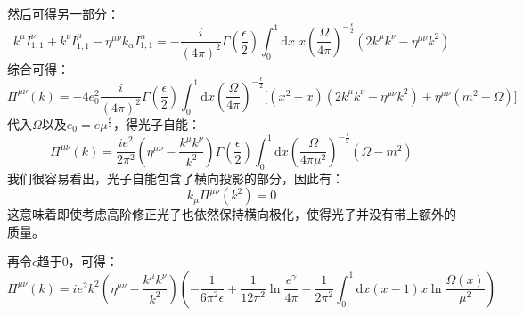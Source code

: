 然后可得另一部分：
\begin{equation}
    k^\mu I^\nu_{1,1}+k^\nu I^\mu_{1,1}-\eta^{\mu\nu}k_\alpha I^\alpha_{1,1} = -\frac{i}{(4\pi)^2}\Gamma(\frac{\epsilon}{2})\int_0^1\mathrm{d}x \;x \left(\frac{\Omega}{4\pi}\right)^{-\frac{\epsilon}{2}}(2k^\mu k^\nu-\eta^{\mu\nu}k^2)
\end{equation}
综合可得：
\begin{equation}
    \Pi^{\mu\nu}(k)=-4e_0^2\frac{i}{(4\pi)^2}\Gamma(\frac{\epsilon}{2})\int_0^1\mathrm{d}x\left(\frac{\Omega}{4\pi}\right)^{-\frac{\epsilon}{2}}\Big[(x^2-x)(2k^\mu k^\nu-\eta^{\mu\nu}k^2)+\eta^{\mu\nu}(m^2-\Omega)\Big]
\end{equation}%
代入$\Omega$以及$e_0=e\mu^\frac{\epsilon}{2}$，得光子自能：
\begin{equation}
    \Pi^{\mu\nu}(k)=\frac{ie^2}{2\pi^2}\left(\eta^{\mu\nu}-\frac{k^\mu k^\nu}{k^2}\right)\Gamma(\frac{\epsilon}{2})\int_0^1\mathrm{d}x\left(\frac{\Omega}{4\pi\mu^2}\right)^{-\frac{\epsilon}{2}}(\Omega-m^2)
\end{equation}
我们很容易看出，光子自能包含了横向投影的部分，因此有：
\begin{equation}
k_\mu \Pi^{\mu\nu}(k^2)=0
\end{equation}
这意味着即使考虑高阶修正光子也依然保持横向极化，使得光子并没有带上额外的质量。

再令$\epsilon$趋于0，可得：
\begin{equation}
    \Pi^{\mu\nu}(k)={ie^2}k^2\left(\eta^{\mu\nu}-\frac{k^\mu k^\nu}{k^2}\right)\left(-\frac{1}{6\pi^2\epsilon}+\frac{1}{12\pi^2}\ln\frac{e^\gamma}{4\pi}-\frac{1}{2\pi^2}\int_0^1\mathrm{d}x(x-1)x\ln\frac{\Omega(x)}{\mu^2}\right)
\end{equation}%

